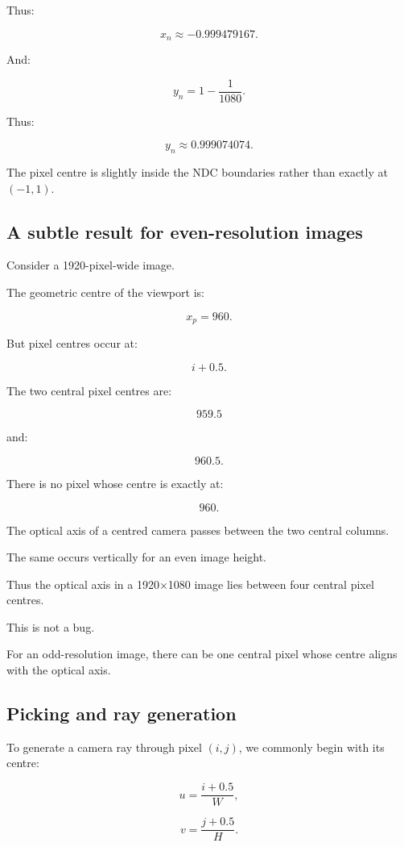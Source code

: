 Thus:

\[
 \boxed{x_n\approx-0.999479167}.
\]

And:

\[
 y_n=1-\frac1{1080}.
\]

Thus:

\[
 \boxed{y_n\approx0.999074074}.
\]

The pixel centre is slightly inside the NDC boundaries rather than exactly at \((-1,1)\).

\subsection{A subtle result for even-resolution images}\label{02-foundations-ii-ch033-a-subtle-result-for-even-resolution-images}

Consider a 1920-pixel-wide image.

The geometric centre of the viewport is:

\[
 x_p=960.
\]

But pixel centres occur at:

\[
 i+0.5.
\]

The two central pixel centres are:

\[
 959.5
\]

and:

\[
 960.5.
\]

There is no pixel whose centre is exactly at:

\[
 960.
\]

The optical axis of a centred camera passes between the two central columns.

The same occurs vertically for an even image height.

Thus the optical axis in a 1920×1080 image lies between four central pixel centres.

This is not a bug.

For an odd-resolution image, there can be one central pixel whose centre aligns with the optical axis.

\subsection{Picking and ray generation}\label{02-foundations-ii-ch033-picking-and-ray-generation}

To generate a camera ray through pixel \((i,j)\), we commonly begin with its centre:

\[
 u=\frac{i+0.5}{W},
\]

\[
 v=\frac{j+0.5}{H}.
\]

